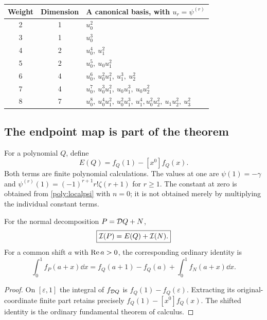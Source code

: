 \begin{center}
\small
\begin{tabular}{ccl}
\toprule
Weight & Dimension & A canonical basis, with $u_r=\psi^{(r)}$\\
\midrule
2&1&$u_0^2$\\
3&1&$u_0^3$\\
4&2&$u_0^4,\ u_1^2$\\
5&2&$u_0^5,\ u_0u_1^2$\\
6&4&$u_0^6,\ u_0^2u_1^2,\ u_1^3,\ u_2^2$\\
7&4&$u_0^7,\ u_0^3u_1^2,\ u_0u_1^3,\ u_0u_2^2$\\
8&7&$u_0^8,\ u_0^4u_1^2,\ u_0^2u_1^3,\ u_1^4,
 u_0^2u_2^2,\ u_1u_2^2,\ u_3^2$\\
\bottomrule
\end{tabular}
\end{center}

\subsection{The endpoint map is part of the theorem}

For a polynomial $Q$, define
\begin{equation}\label{poly:endpoint}
 E(Q)=f_Q(1)-[x^0]f_Q(x).
\end{equation}
Both terms are finite polynomial calculations. The values at one are
$\psi(1)=-\gamma$ and
$\psi^{(r)}(1)=(-1)^{r+1}r!\zeta(r+1)$ for $r\ge1$.
The constant at zero is obtained from \eqref{poly:localpsi} with $n=0$;
it is not obtained merely by multiplying the individual constant terms.

\begin{corollary}
\label{poly:endpointcor}
For the normal decomposition $P=\mathcal D Q+N$,
\begin{equation}\label{poly:IBPintegral}
 \boxed{\mathcal I(P)=E(Q)+\mathcal I(N).}
\end{equation}
For a common shift $a$ with $\operatorname{Re} a>0$, the corresponding ordinary
identity is
\begin{equation}\label{poly:IBPshift}
 \int_0^1f_P(a+x)\dd x
 =f_Q(a+1)-f_Q(a)+\int_0^1f_N(a+x)\dd x.
\end{equation}
\end{corollary}
\begin{proof}
On $[\varepsilon,1]$ the integral of $f_{\mathcal D Q}$ is
$f_Q(1)-f_Q(\varepsilon)$. Extracting its original-coordinate
finite part retains precisely $f_Q(1)-[x^0]f_Q(x)$.
The shifted identity is the ordinary fundamental theorem of calculus.
\end{proof}

